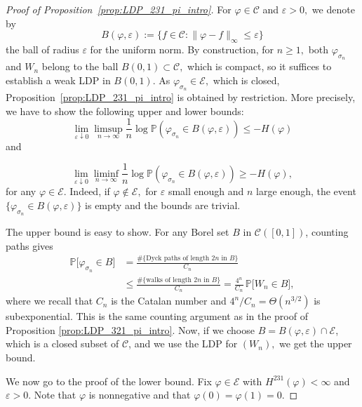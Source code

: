 \documentclass[a4paper,11pt]{amsart}
\newcommand{\eps}{\varepsilon}
\theoremstyle{definition}
\begin{document}
\begin{proof}[Proof of Proposition~\ref{prop:LDP_231_pi_intro}]
For $\varphi \in \mathcal C$ and $\varepsilon >0,$ we denote by
\[ B(\varphi , \varepsilon ) := \{ f\in  \mathcal C : \| \varphi-f\|_\infty \le \varepsilon\}\]
the ball of radius $\varepsilon$ for the uniform norm.
By construction, for $n\ge 1,$ both $\varphi_{\sigma_n}$ and $W_n$ belong to the ball $B(0,1) \subset \mathcal C,$ which is compact, so it suffices to establish a weak LDP in $B(0,1).$ As   $\varphi_{\sigma_n} \in \mathcal E,$ which is closed, Proposition~\ref{prop:LDP_231_pi_intro} is obtained by restriction.
More precisely, we have to show the following upper and lower bounds:
\[ \lim_{\varepsilon \downarrow 0} \limsup_{n \rightarrow\infty} 
\frac1n \log
\mathbb P(\varphi_{\sigma_n} \in B(\varphi , \varepsilon )) \le - H(\varphi)\]
and

\[ \lim_{\varepsilon \downarrow 0} \liminf_{n \rightarrow\infty} 
\frac1n \log
\mathbb P(\varphi_{\sigma_n} \in B(\varphi , \varepsilon )) \ge - H(\varphi),\]
 for any $\varphi\in \mathcal E.$
Indeed, if $\varphi \notin \mathcal E,$ for $\varepsilon$ small enough and $n$ large enough, the event $\{\varphi_{\sigma_n} \in B(\varphi , \varepsilon )\}$ is empty and the bounds are trivial.

 The upper bound is easy to show.
    For any Borel set $B$ in $\mathcal{C}([0,1])$, counting paths gives
    \begin{align*}
        \mathbb{P}\big[ \varphi_{\sigma_n}\in B \big]
       & = \frac{\#\{\text{Dyck paths of length $2n$ in }B\}}{C_n}\\
        & \le \frac{\#\{\text{walks of length }2n\text{ in }B\}}{C_n}
        = \frac{4^n}{C_n}\, \mathbb{P}\big[ W_n \in B \big],
    \end{align*}
    where we recall that $C_n$ is the Catalan number and $4^n/C_n = \Theta(n^{3/2})$ is subexponential. This is the same counting argument as in the proof of Proposition \ref{prop:LDP_321_pi_intro}.
   Now, if we choose $B=  B(\varphi , \varepsilon ) \cap \mathcal{E}$, which is a closed subset of $\mathcal{C}$, and we use the LDP for $(W_n),$ we get the upper bound.


 We now go to the proof of the lower bound.
    Fix $\varphi \in \mathcal E$ with $H^{231}(\varphi)<\infty$ and $\eps>0$. 
    Note that $\varphi$ is nonnegative and that $\varphi(0) = \varphi(1) = 0.$


\end{proof}
\end{document}
